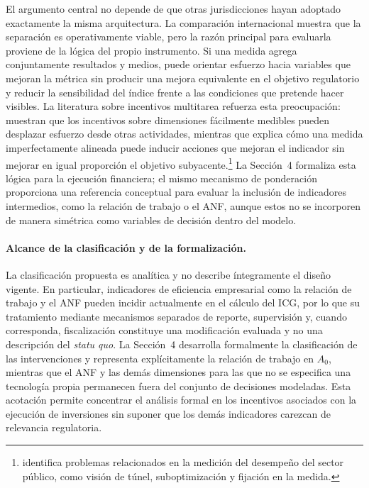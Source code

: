 El argumento central no depende de que otras jurisdicciones hayan adoptado exactamente la misma arquitectura. La comparación internacional muestra que la separación es operativamente viable, pero la razón principal para evaluarla proviene de la lógica del propio instrumento. Si una medida agrega conjuntamente resultados y medios, puede orientar esfuerzo hacia variables que mejoran la métrica sin producir una mejora equivalente en el objetivo regulatorio y reducir la sensibilidad del índice frente a las condiciones que pretende hacer visibles. La literatura sobre incentivos multitarea refuerza esta preocupación: \citet{holmstrom1991multitask} muestran que los incentivos sobre dimensiones fácilmente medibles pueden desplazar esfuerzo desde otras actividades, mientras que \citet{baker1992incentive} explica cómo una medida imperfectamente alineada puede inducir acciones que mejoran el indicador sin mejorar en igual proporción el objetivo subyacente.\footnote{\citet{smith1995unintended} identifica problemas relacionados en la medición del desempeño del sector público, como visión de túnel, suboptimización y fijación en la medida.} La Sección~4 formaliza esta lógica para la ejecución financiera; el mismo mecanismo de ponderación proporciona una referencia conceptual para evaluar la inclusión de indicadores intermedios, como la relación de trabajo o el ANF, aunque estos no se incorporen de manera simétrica como variables de decisión dentro del modelo.

\paragraph{Alcance de la clasificación y de la formalización.}

La clasificación propuesta es analítica y no describe íntegramente el diseño vigente. En particular, indicadores de eficiencia empresarial como la relación de trabajo y el ANF pueden incidir actualmente en el cálculo del ICG, por lo que su tratamiento mediante mecanismos separados de reporte, supervisión y, cuando corresponda, fiscalización constituye una modificación evaluada y no una descripción del \emph{statu quo}. La Sección~4 desarrolla formalmente la clasificación de las intervenciones y representa explícitamente la relación de trabajo en \(A_0\), mientras que el ANF y las demás dimensiones para las que no se especifica una tecnología propia permanecen fuera del conjunto de decisiones modeladas. Esta acotación permite concentrar el análisis formal en los incentivos asociados con la ejecución de inversiones sin suponer que los demás indicadores carezcan de relevancia regulatoria.

